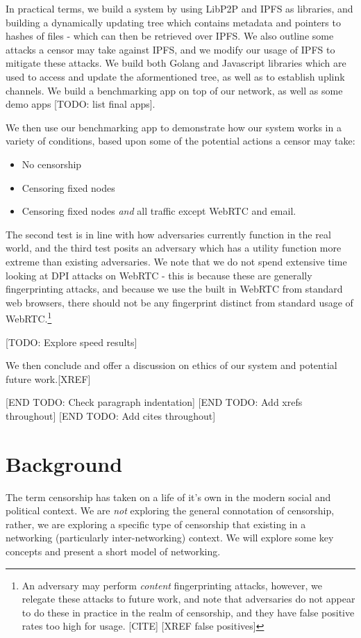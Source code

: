 \documentclass[12pt]{report}
\begin{document}
In practical terms, we build a system by using LibP2P and IPFS as libraries, and building a dynamically updating tree which contains metadata and pointers to hashes of files - which can then be retrieved over IPFS. We also outline some attacks a censor may take against IPFS, and we modify our usage of IPFS to mitigate these attacks. We build both Golang and Javascript libraries which are used to access and update the aformentioned tree, as well as to establish uplink channels. We build a benchmarking app on top of our network, as well as some demo apps [TODO: list final apps].

We then use our benchmarking app to demonstrate how our system works in a variety of conditions, based upon some of the potential actions a censor may take:
\begin{itemize}
  \item No censorship
  \item Censoring fixed nodes
  \item Censoring fixed nodes \emph{and} all traffic except WebRTC and email.
\end{itemize}

The second test is in line with how adversaries currently function in the real world, and the third test posits an adversary which has a utility function more extreme than existing adversaries. We note that we do not spend extensive time looking at DPI attacks on WebRTC - this is because these are generally fingerprinting attacks, and because we use the built in WebRTC from standard web browsers, there should not be any fingerprint distinct from standard usage of WebRTC.\footnote{An adversary may perform \emph{content} fingerprinting attacks, however, we relegate these attacks to future work, and note that adversaries do not appear to do these in practice in the realm of censorship, and they have false positive rates too high for usage. [CITE] [XREF false positives]}

[TODO: Explore speed results]

We then conclude and offer a discussion on ethics of our system and potential future work.[XREF]

[END TODO: Check paragraph indentation]
[END TODO: Add xrefs throughout]
[END TODO: Add cites throughout]

\chapter{Background}

The term censorship has taken on a life of it's own in the modern social and political context. We are \emph{not} exploring the general connotation of censorship, rather, we are exploring a specific type of censorship that existing in a networking (particularly inter-networking) context. We will explore some key concepts and present a short model of networking.
\end{document}
